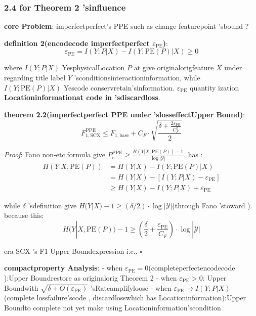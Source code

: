 \documentclass[
  12pt,
]{article}
\begin{document}
\subsubsection{2.4 for  Theorem 2
'sinfluence }\label{ux5bf9-theorem-2-ux7684ux5f71ux54cd}

\textbf{core Problem}: imperfectperfect's PPE such as change featurepoint 'sbound ?

\textbf{definition  2(encodecode imperfectperfect \(\varepsilon_{\text{PE}}\))}: 
\[\boxed{\varepsilon_{\text{PE}} = I(Y; P | X) - I(Y; \text{PE}(P) | X) \geq 0}\]

where \(I(Y; P | X)\) YesphysicalLocation \(P\) at give originalorigfeature \(X\) under regarding title label
\(Y\) 'sconditionsinteractioninformation, while  \(I(Y; \text{PE}(P) | X)\)
Yescode conservretain'sinformation. \(\varepsilon_{\text{PE}}\)
quantity ization \textbf{Locationinformationat code in 'sdiscardloss}. 

\textbf{theorem  2.2(imperfectperfect PPE under 'slosseffectUpper Bound)}: 
\[\boxed{F_{1,\text{SCX}}^{\text{PPE}} \leq F_{1,\text{base}} + C_F \cdot \sqrt{\frac{\delta + \frac{2\varepsilon_{\text{PE}}}{C_F^2}}{2}}}\]

\emph{Proof}: Fano non-etc.formula give 
\(P_e^{\text{PPE}} \geq \frac{H(Y|X, \text{PE}(P)) - 1}{\log |\mathcal{Y}|}\). has : 
\begin{align*}
H(Y|X, \text{PE}(P)) &= H(Y|X) - I(Y; \text{PE}(P) | X) \\
&= H(Y|X) - [I(Y; P | X) - \varepsilon_{\text{PE}}] \\
&\geq H(Y|X) - I(Y; P | X) + \varepsilon_{\text{PE}}
\end{align*}

while  \(\delta\) 'sdefinition give 
\(H(Y|X) - 1 \geq (\delta/2) \cdot \log|\mathcal{Y}|\)(through  Fano
'stoward ). because this: 
\[H(Y|X, \text{PE}(P)) - 1 \geq \left(\frac{\delta}{2} + \frac{\varepsilon_{\text{PE}}}{C_F}\right) \cdot \log|\mathcal{Y}|\]

era  SCX 's F1 Upper Boundexpression i.e.. \(\square\)

\textbf{compactproperty Analysis}:  - when 
\(\varepsilon_{\text{PE}} = 0\)(completeperfectencodecode ):Upper Boundrestore as originalorig Theorem 2 -
when  \(\varepsilon_{\text{PE}} > 0\): Upper Boundwith 
\(\sqrt{\delta + O(\varepsilon_{\text{PE}})}\) 'sRateamplifyloose - when 
\(\varepsilon_{\text{PE}} \to I(Y; P | X)\)(complete lossfailure'scode , discardlosswhich has Locationinformation):Upper Boundto complete not yet make using Locationinformation'scondition
\end{document}
